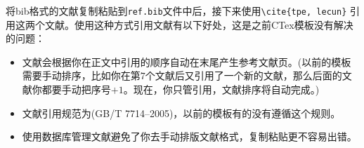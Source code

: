 将bib格式的文献复制粘贴到\verb|ref.bib|文件中后，接下来使用\verb|\cite{tpe, lecun}| \cite{tpe, lecun}引用这两个文献。使用这种方式引用文献有以下好处，这是之前CTex模板没有解决的问题：
\begin{tcolorbox}[colback=gray!10,
    colframe=black,
    width=16cm,
    arc=1mm, auto outer arc,
    boxrule=0.5pt,]
    \begin{itemize}
        \item 文献会根据你在正文中引用的顺序自动在末尾产生参考文献页。(以前的模板需要手动排序，比如你在第$7$个文献后又引用了一个新的文献，那么后面的文献你都要手动把序号$+1$。现在，你只管引用，文献排序将自动完成。)
        \item 文献引用规范为(GB/T 7714--2005)，以前的模板有的没有遵循这个规则。
        \item 使用数据库管理文献避免了你去手动排版文献格式，复制粘贴更不容易出错。
    \end{itemize}
\end{tcolorbox}

